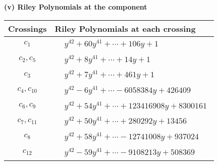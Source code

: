 \documentclass[1p]{elsarticle_modified}
\theoremstyle{definition}
\begin{document}
\newpage\renewcommand{\arraystretch}{1}
\flushleft \textbf{(v) Riley Polynomials at the component}\newline \\
\begin{tabular}{m{50pt}|m{274pt}}
Crossings & \hspace{64pt}Riley Polynomials at each crossing \\
\hline $$\begin{aligned}c_{1}\end{aligned}$$&$\begin{aligned}
&y^{42}+60 y^{41}+\cdots+106 y+1
\end{aligned}$\\
\hline $$\begin{aligned}c_{2},c_{5}\end{aligned}$$&$\begin{aligned}
&y^{42}+8 y^{41}+\cdots+14 y+1
\end{aligned}$\\
\hline $$\begin{aligned}c_{3}\end{aligned}$$&$\begin{aligned}
&y^{42}+7 y^{41}+\cdots+461 y+1
\end{aligned}$\\
\hline $$\begin{aligned}c_{4},c_{10}\end{aligned}$$&$\begin{aligned}
&y^{42}-6 y^{41}+\cdots-6058384 y+426409
\end{aligned}$\\
\hline $$\begin{aligned}c_{6},c_{9}\end{aligned}$$&$\begin{aligned}
&y^{42}+54 y^{41}+\cdots+123416908 y+8300161
\end{aligned}$\\
\hline $$\begin{aligned}c_{7},c_{11}\end{aligned}$$&$\begin{aligned}
&y^{42}+50 y^{41}+\cdots+280292 y+13456
\end{aligned}$\\
\hline $$\begin{aligned}c_{8}\end{aligned}$$&$\begin{aligned}
&y^{42}+58 y^{41}+\cdots-12741008 y+937024
\end{aligned}$\\
\hline $$\begin{aligned}c_{12}\end{aligned}$$&$\begin{aligned}
&y^{42}-59 y^{41}+\cdots-9108213 y+508369
\end{aligned}$\\
\hline
\end{tabular}\\~\\
\end{document}
